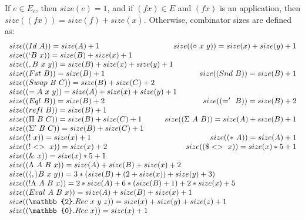 \documentclass{lmcs}
\begin{document}
\begin{defi}
  If \(e \in E_c\), then \(size(e) = 1\), and if \((f x) \in E\) and \((f x)\) is an application, then \(size((f x)) = size(f) + size(x)\). Otherwise, combinator sizes are defined as:
  \[
    \begin{array}{l @{\hspace{3em}} r}
      size(\comb[Id][A]) = size(A) + 1 & size(\comb[\circ][x][y]) = size(x) + size(y) + 1\\
      \multicolumn{2}{l}{size(\comb[`B][x]) = size(B) + size(x) + 1}\\
      \multicolumn{2}{l}{size(\comb[,B][x][y]) = size(B) + size(x) + size(y) + 1}\\
      size(\comb[Fst][B]) = size(B) + 1 & size(\comb[Snd][B]) = size(B) + 1\\
      \multicolumn{2}{l}{size(\comb[Swap][B][C]) = size(B) + size(C) + 2}\\
      \multicolumn{2}{l}{size(\comb[= A][x][y]) = size(A) + size(x) + size(y) + 1}\\
      size(\comb[Eql][B]) = size(B) + 2 & size(\comb[='][B]) = size(B) + 2\\
      \multicolumn{2}{l}{size(\comb[refl][B]) = size(B) + 1}\\
      size(\comb[\Pi][B][C]) = size(B) + size(C) + 1 & size(\comb[\Sigma][A][B]) = size(A) + size(B) + 1\\
      \multicolumn{2}{l}{size(\comb[\Sigma'][B][C]) = size(B) + size(C) + 1}\\
      size(\comb[!][x]) = size(x) + 1 & size(\comb[*][A]) = size(A) + 1\\
      size(\comb[!<>][x]) = size(x) + 2 & size(\comb[\$<>][x]) = size(x) * 5 + 1\\
      \multicolumn{2}{l}{size(\comb[\&][x]) = size(x) * 5 + 1}\\
      \multicolumn{2}{l}{size(\comb[\Lambda][A][B][x]) = size(A) + size(B) + size(x) + 2}\\
      \multicolumn{2}{l}{size(\comb[\langle , \rangle B][x][y]) = 3 * (size(B) + (2 + size(x)) + size(y) + 3)}\\
      \multicolumn{2}{l}{size(\comb[!\Lambda][A][B][x]) = 2 * size(A) + 6 * (size(B) + 1) + 2 * size(x) + 5}\\
      \multicolumn{2}{l}{size(\comb[Eval][A][B][x]) = size(A) + size(B) + size(x) + 1}\\
      \multicolumn{2}{l}{size(\comb[\mathbb{2}.Rec][x][y][z]) = size(x) + size(y) + size(z) + 1}\\
      \multicolumn{2}{l}{size(\comb[\mathbb{0}.Rec][x]) = size(x) + 1}
    \end{array}
  \]
\end{defi}
\end{document}
